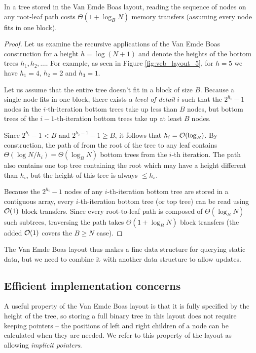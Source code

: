 \begin{theorem}
In a tree stored in the Van Emde Boas layout, reading the sequence of nodes
on any root-leaf path costs $\Theta(1+\log_B N)$ memory transfers (assuming
every node fits in one block).
\end{theorem}

\begin{proof}
Let us examine the recursive applications of the Van Emde Boas construction
for a height $h=\log (N+1)$ and denote the heights of the bottom trees
$h_1, h_2, \ldots$. For example, as seen in Figure \ref{fig:veb_layout_5}, for
$h=5$ we have $h_1=4$, $h_2=2$ and $h_3=1$.

Let us assume that the entire tree doesn't fit in a block of size $B$.
Because a single node fits in one block, there exists a \textit{level of
detail} $i$ such that the $2^{h_i}-1$ nodes in the $i$-th-iteration bottom trees
take up less than $B$ nodes, but bottom trees of the $i-1$-th-iteration bottom
trees take up at least $B$ nodes.

Since $2^{h_i}-1 < B$ and $2^{h_i-1}-1 \geq B$, it follows that $h_i=\mathcal{O}(\log_B)$.
By construction, the path of from the root of the tree to any leaf contains
$\Theta(\log N/h_i)=\Theta(\log_B N)$ bottom trees from the $i$-th iteration.
The path also contains one top tree containing the root which may have a height
different than $h_i$, but the height of this tree is always $\leq h_i$.

Because the $2^{h_i}-1$ nodes of any $i$-th-iteration bottom tree are stored
in a contiguous array, every $i$-th-iteration bottom tree (or top tree)
can be read using $\mathcal{O}(1)$ block transfers. Since every root-to-leaf path
is composed of $\Theta(\log_B N)$ such subtrees, traversing the path
takes $\Theta(1+\log_B N)$ block transfers (the added $\mathcal{O}(1)$ covers
the $B\geq N$ case).
\end{proof}

The Van Emde Boas layout thus makes a fine data structure for querying static
data, but we need to combine it with another data structure to allow updates.

\subsection{Efficient implementation concerns}
A useful property of the Van Emde Boas layout is that it is fully specified
by the height of the tree, so storing a full binary tree in this layout does
not require keeping pointers -- the positions of left and right children
of a node can be calculated when they are needed. We refer to this property
of the layout as allowing \textit{implicit pointers}.


